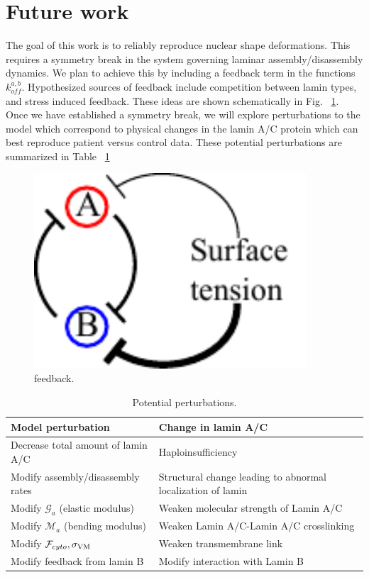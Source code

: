 \section{Future work} \label{sec:futurework}

The goal of this work is to reliably reproduce nuclear shape deformations. This requires a symmetry break in the system governing laminar assembly/disassembly dynamics. We plan to achieve this by including a feedback term in the functions $k_{off}^{a,b}$. Hypothesized sources of feedback include competition between lamin types, and stress induced feedback. These ideas are shown schematically in Fig. ~\ref{fig::feedback}. Once we have established a symmetry break, we will explore perturbations to the model which correspond to physical changes  in the lamin A/C protein which can best reproduce patient versus control data. These potential perturbations are summarized in Table ~\ref{tab:perturbations}


\begin{figure}[h]
\centering
\captionsetup{width=.9\linewidth}
\includegraphics[width=4in]{Project3/figs/feedback_stretch.pdf}
\caption{feedback.}
\label{fig::feedback}
\end{figure}


\begin{table}[t!]
\caption{Potential perturbations.}\centering \label{tab:perturbations} 
\begin{tabular}{ l  l}
\hline
Model perturbation & Change in lamin A/C \\
\hline
Decrease total amount of lamin A/C  & Haploinsufficiency  \\
Modify assembly/disassembly rates & Structural change leading to abnormal localization of lamin\\
Modify $\mathcal{G}_a$ (elastic modulus) & Weaken molecular strength of Lamin A/C  \\
Modify $\mathcal{M}_a$ (bending modulus)& Weaken Lamin A/C-Lamin A/C crosslinking  \\
Modify $\mathcal{F}_{cyto}, \sigma_{\rm VM}$ & Weaken transmembrane link  \\
Modify feedback from lamin B &Modify interaction with Lamin B \\
\hline
\end{tabular}
\end{table}